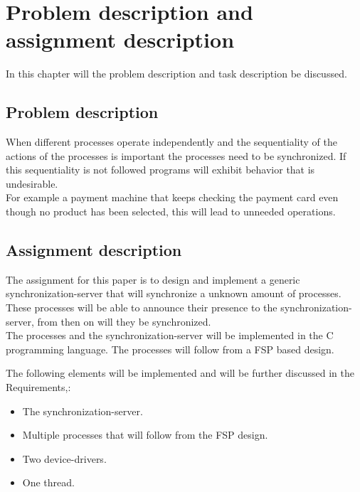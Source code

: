 \hypertarget{problem-description-and-assignment-description}{%
\section{Problem description and assignment
description}\label{problem-description-and-assignment-description}}

In this chapter will the problem description and task description be
discussed.

\hypertarget{problem-description}{%
\subsection{Problem description}\label{problem-description}}

When different processes operate independently and the sequentiality of
the actions of the processes is important the processes need to be
synchronized. If this sequentiality is not followed programs will
exhibit behavior that is undesirable.\\
For example a payment machine that keeps checking the payment card even
though no product has been selected, this will lead to unneeded
operations.

\hypertarget{assignment-description}{%
\subsection{Assignment description}\label{assignment-description}}

The assignment for this paper is to design and implement a generic
synchronization-server that will synchronize a unknown amount of
processes. These processes will be able to announce their presence to
the synchronization-server, from then on will they be synchronized.\\
The processes and the synchronization-server will be implemented in the
C programming language. The processes will follow from a FSP based
design.

The following elements will be implemented and will be further discussed
in the Requirements,:

\begin{itemize}
\tightlist
\item
  The synchronization-server.
\item
  Multiple processes that will follow from the FSP design.
\item
  Two device-drivers.
\item
  One thread.
\end{itemize}
